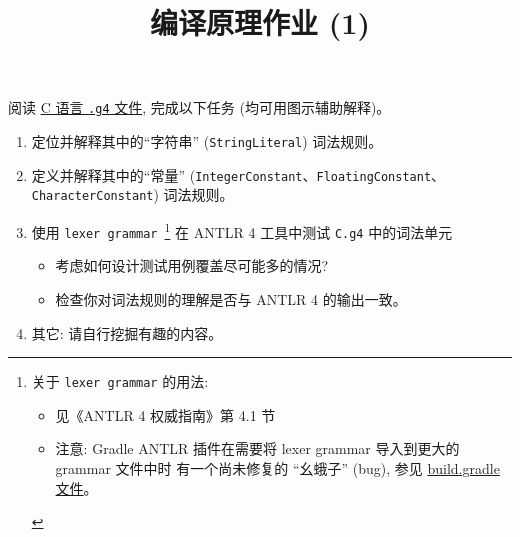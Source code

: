 \documentclass[a4paper, justified]{tufte-handout}
\title{编译原理作业 (1)}
\date{\zhtoday}
\begin{document}
\maketitle
\noplagiarism %
\begin{abstract}
\end{abstract}
\beginrequired
\begin{problem}
  阅读 \href{https://github.com/antlr/grammars-v4/blob/master/c/C.g4}{C 语言 \texttt{.g4}
  文件}, 完成以下任务 (均可用图示辅助解释)。
  \begin{enumerate}[(1)]
    \item 定位并解释其中的``字符串'' (\texttt{StringLiteral}) 词法规则。
    \item 定义并解释其中的``常量'' (\texttt{IntegerConstant}、\texttt{FloatingConstant}、\texttt{CharacterConstant}) 词法规则。
    \item 使用 \texttt{lexer grammar}~\footnote{
      关于 \texttt{lexer grammar} 的用法:
      \begin{itemize}
        \item 见《ANTLR 4 权威指南》第 4.1 节
        \item 注意: Gradle ANTLR 插件在需要将 lexer grammar 导入到更大的 grammar 文件中时
          有一个尚未修复的 ``幺蛾子'' (bug), 参见 \href{https://github.com/courses-at-nju-by-hfwei/2024-compilers-coding-0/blob/5bac437778703698372b4913d0d5197e7890bc02/build.gradle\#L34}{build.gradle 文件}。
      \end{itemize}} 在 ANTLR 4 工具中测试 \texttt{C.g4} 中的词法单元
      \begin{itemize}
        \item 考虑如何设计测试用例覆盖尽可能多的情况?
        \item 检查你对词法规则的理解是否与 ANTLR 4 的输出一致。
      \end{itemize}
    \item 其它: 请自行挖掘有趣的内容。
  \end{enumerate}
\end{problem}

\begin{solution}
\end{solution}
\end{document}
